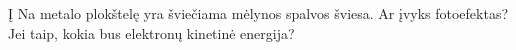 \question Į Na metalo plokštelę yra šviečiama mėlynos spalvos šviesa. Ar įvyks fotoefektas? Jei taip, kokia bus elektronų kinetinė energija?